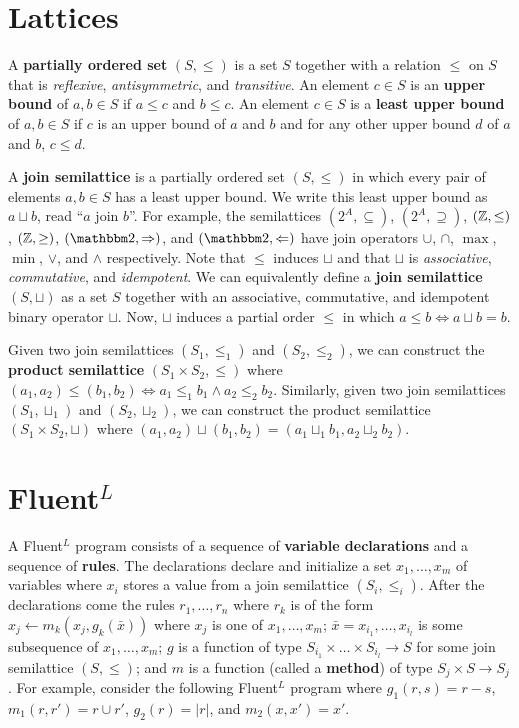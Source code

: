 \documentclass{mwhittaker}
\title{\fluentl}
\author{\ }
\date{\ }
\newcommand{\join}{\sqcup}
\newcommand{\fluentl}{Fluent$^L$}
\begin{document}
\maketitle

\section*{Lattices}
A \textbf{partially ordered set} $(S, \leq)$ is a set $S$ together with a
relation $\leq$ on $S$ that is \textit{reflexive}, \textit{antisymmetric}, and
\textit{transitive}. An element $c \in S$ is an \textbf{upper bound} of $a, b
\in S$ if $a \leq c$ and $b \leq c$. An element $c \in S$ is a \textbf{least
upper bound} of $a, b \in S$ if $c$ is an upper bound of $a$ and $b$ and for
any other upper bound $d$ of $a$ and $b$, $c \leq d$.

A \textbf{join semilattice} is a partially ordered set $(S, \leq)$ in which
every pair of elements $a, b \in S$ has a least upper bound. We write this
least upper bound as $a \join b$, read ``$a$ join $b$''. For example, the
semilattices $(2^A, \subseteq)$, $(2^A, \supseteq)$, $(\mathbb{Z}, \leq)$, $(\mathbb{Z},
\geq)$, $(\bools, \Rightarrow)$, and $(\bools, \Leftarrow)$ have join operators
$\cup$, $\cap$, $\max$, $\min$, $\lor$, and $\land$ respectively. Note that
$\leq$ induces $\join$ and that $\join$ is \textit{associative},
\textit{commutative}, and \textit{idempotent}.
%
We can equivalently define a \textbf{join semilattice} $(S, \join)$ as a set
$S$ together with an associative, commutative, and idempotent binary operator
$\join$. Now, $\join$ induces a partial order $\leq$ in which $a \leq b \iff a
\join b = b$.

Given two join semilattices $(S_1, \leq_1)$ and $(S_2, \leq_2)$, we can
construct the \textbf{product semilattice} $(S_1 \times S_2, \leq)$ where
$(a_1, a_2) \leq (b_1, b_2) \iff a_1 \leq_1 b_1 \land a_2 \leq_2 b_2$.
Similarly, given two join semilattices $(S_1, \join_1)$ and $(S_2, \join_2)$,
we can construct the product semilattice $(S_1 \times S_2, \join)$ where $(a_1,
a_2) \join (b_1, b_2) = (a_1 \join_1 b_1, a_2 \join_2 b_2)$.

\section*{\fluentl}
A \fluentl{} program consists of a sequence of \textbf{variable declarations}
and a sequence of \textbf{rules}. The declarations declare and initialize a set
$x_1, \ldots, x_m$ of variables where $x_i$ stores a value from a join
semilattice $(S_i, \leq_i)$. After the declarations come the rules $r_1,
\ldots, r_n$ where $r_k$ is of the form $x_j \gets m_k(x_j, g_k(\bar{x}))$
where $x_j$ is one of $x_1, \ldots, x_m$; $\bar{x} = x_{i_1}, \ldots, x_{i_l}$
is some subsequence of $x_1, \ldots, x_m$; $g$ is a function of type $S_{i_1}
\times \ldots \times S_{i_l} \to S$ for some join semilattice $(S, \leq)$; and
$m$ is a function (called a \textbf{method}) of type $S_j \times S \to S_j$.
For example, consider the following \fluentl{} program where $g_1(r, s) = r -
s$, $m_1(r, r') = r \cup r'$, $g_2(r) = |r|$, and $m_2(x, x') = x'$.
\end{document}
